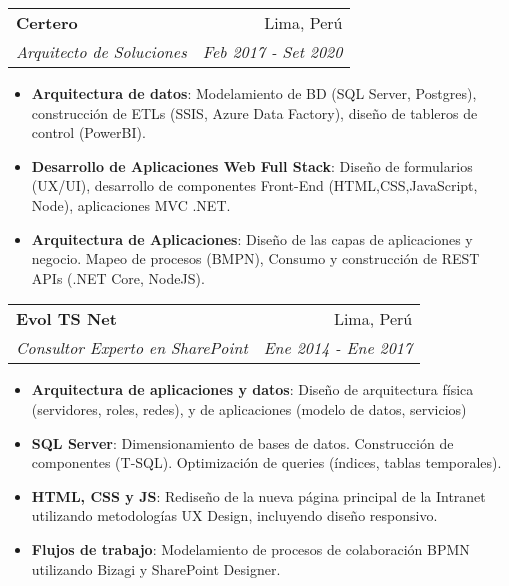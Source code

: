 \documentclass[letterpaper,11pt]{article}
\makeatletter
\newcommand{\resumeItem}[2]{
  \item\small{
    \textbf{#1}{: #2 \vspace{-2pt}}
  }
}
\newcommand{\resumeSubheading}[4]{
  \vspace{-1pt}\item
    \begin{tabular*}{0.97\textwidth}[t]{l@{\extracolsep{\fill}}r}
      \textbf{#1} & #2 \\
      \textit{\small#3} & \textit{\small #4} \\
    \end{tabular*}\vspace{-5pt}
}
\newcommand{\resumeSubSubheading}[2]{
    \begin{tabular*}{0.97\textwidth}{l@{\extracolsep{\fill}}r}
      \textit{\small#1} & \textit{\small #2} \\
    \end{tabular*}\vspace{-5pt}
}
\newcommand{\resumeSubHeadingListEnd}{\end{itemize}}
\newcommand{\resumeItemListStart}{\begin{itemize}}
\newcommand{\resumeItemListEnd}{\end{itemize}\vspace{-5pt}}
\makeatother
\begin{document}
    \resumeSubheading
      {Certero}{Lima, Perú}
      {Arquitecto de Soluciones}{Feb 2017 - Set 2020}
      \resumeItemListStart
        \resumeItem{Arquitectura de datos}
          {Modelamiento de BD (SQL Server, Postgres), construcción de ETLs (SSIS, Azure Data Factory), diseño de tableros de control (PowerBI).}
        \resumeItem{Desarrollo de Aplicaciones Web Full Stack}
          {Diseño de formularios (UX/UI), desarrollo de componentes Front-End (HTML,CSS,JavaScript, Node), aplicaciones MVC .NET.}          
        \resumeItem{Arquitectura de Aplicaciones}
          {Diseño de las capas de aplicaciones y negocio. Mapeo de procesos (BMPN), Consumo y construcción de REST APIs (.NET Core, NodeJS).}
 
      \resumeItemListEnd
      

    \resumeSubheading
      {Evol TS Net}{ Lima, Perú}
      {Consultor Experto en SharePoint}{Ene 2014 - Ene 2017}
      \resumeItemListStart
        \resumeItem{Arquitectura de aplicaciones y datos}
          {Diseño de arquitectura física (servidores, roles, redes), y de aplicaciones (modelo de datos, servicios)}
        \resumeItem{SQL Server}
          {Dimensionamiento de bases de datos. Construcción de componentes (T-SQL). Optimización de queries (índices, tablas temporales).}        
        \resumeItem{HTML, CSS y JS}
          {Rediseño de la nueva página principal de la Intranet utilizando metodologías UX Design, incluyendo diseño responsivo.}
        \resumeItem{Flujos de trabajo}
          {Modelamiento de procesos de colaboración BPMN utilizando Bizagi y SharePoint Designer.}        
      \resumeItemListEnd

\end{document}
